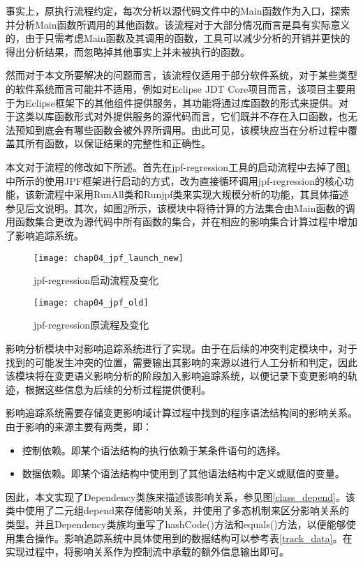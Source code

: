 事实上，原执行流程约定，每次分析以源代码文件中的Main函数作为入口，探索并分析Main函数所调用的其他函数。该流程对于大部分情况而言是具有实际意义的，由于只需考虑Main函数及其调用的函数，工具可以减少分析的开销并更快的得出分析结果，而忽略掉其他事实上并未被执行的函数。

然而对于本文所要解决的问题而言，该流程仅适用于部分软件系统，对于某些类型的软件系统而言可能并不适用，例如对Eclipse JDT Core项目而言，该项目主要用于为Eclipse框架下的其他组件提供服务，其功能将通过库函数的形式来提供。对于这类以库函数形式对外提供服务的源代码而言，它们既并不存在入口函数，也无法预知到底会有哪些函数会被外界所调用。由此可见，该模块应当在分析过程中覆盖其所有函数，以保证结果的完整性和正确性。

本文对于流程的修改如下所述。首先在jpf-regression工具的启动流程中去掉了图\ref {impact_process}中所示的使用JPF框架进行启动的方式，改为直接循环调用jpf-regression的核心功能，该新流程中采用RunAll类和Runjpf类来实现大规模分析的功能，其具体描述参见后文说明。其次，如图\ref {impact_process_old}所示，该模块中将待计算的方法集合由Main函数的调用函数集合更改为源代码中所有函数的集合，并在相应的影响集合计算过程中增加了影响追踪系统。

\begin{figure}[H]
	\centering
	\texttt{[image: chap04\_jpf\_launch\_new]}
	\caption {jpf-regression启动流程及变化}
	\label {impact_process}	
\end{figure}


\begin{figure}
	\centering
	\texttt{[image: chap04\_jpf\_old]}
	\caption {jpf-regression原流程及变化}
	\label {impact_process_old}	
\end{figure}


影响分析模块中对影响追踪系统进行了实现。由于在后续的冲突判定模块中，对于找到的可能发生冲突的位置，需要输出其影响的来源以进行人工分析和判定，因此该模块将在变更语义影响分析的阶段加入影响追踪系统，以便记录下变更影响的轨迹，根据这些信息为后续的分析过程提供便利。

影响追踪系统需要存储变更影响域计算过程中找到的程序语法结构间的影响关系。由于影响的来源主要有两类，即：
\begin{itemize}
	\item 控制依赖。即某个语法结构的执行依赖于某条件语句的选择。
	\item 数据依赖。即某个语法结构中使用到了其他语法结构中定义或赋值的变量。
\end{itemize}

因此，本文实现了Dependency类族来描述该影响关系，参见图\ref {class_depend}。该类中使用了二元组depend来存储影响关系，并使用了多态机制来区分影响关系的类型。并且Dependency类族均重写了hashCode()方法和equals()方法，以便能够使用集合操作。影响追踪系统中具体使用到的数据结构可以参考表\ref {track_data}。在实现过程中，将影响关系作为控制流中承载的额外信息输出即可。

